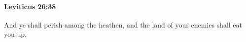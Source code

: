 
		\paragraph{Leviticus 26:38} %
			\label{LEVITICUS-26-38}

			And ye shall perish among the heathen, and the land of your enemies shall eat you up.



